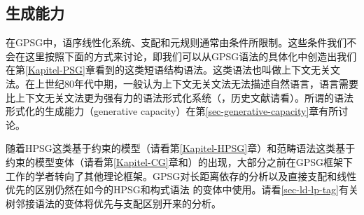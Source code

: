 \subsection{生成能力}

在GPSG中，语序线性化系统、支配和元规则通常由条件所限制。这些条件我们不会在这里按照下面的方式来讨论，即我们可以从GPSG语法的具体化中创造出我们在第\ref{Kapitel-PSG}章看到的这类短语结构语法。这类语法也叫做上下文无关文法。在上世纪80年代中期，一般认为上下文无关文法无法描述自然语言，语言需要比上下文无关文法更为强有力的语法形式化系统（\citealp{Shieber85a,Culy85a}，历史文献请看）。所谓的语法形式化的生成能力（generative capacity）在第\ref{sec-generative-capacity}章有所讨论。

随着HPSG这类基于约束的模型（请看第\ref{Kapitel-HPSG}章）和范畴语法这类基于约束的模型变体（请看第\ref{Kapitel-CG}章和\citealp{Uszkoreit86d}）的出现，大部分之前在GPSG框架下工作的学者转向了其他理论框架。GPSG对长距离依存的分析以及直接支配和线性优先的区别仍然在如今的HPSG\indexhpsgc 和构式语法\indexcxgc
的变体中使用。请看\ref{sec-ld-lp-tag}有关树邻接语法的变体将优先与支配区别开来的分析。

